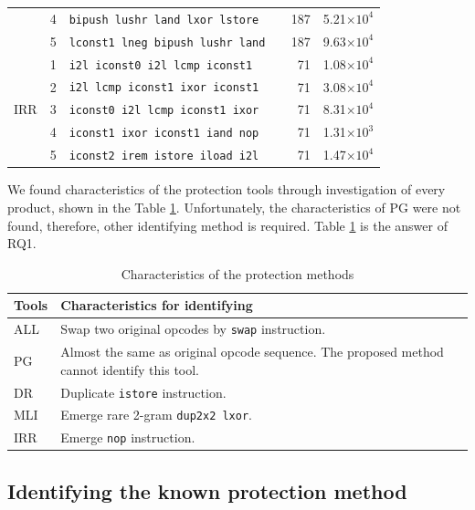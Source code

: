 \documentclass[conference]{IEEEtran}
\begin{document}
\begin{table}[t]
{\begin{tabular}{lc|l|r|r}
& 4 & \verb!bipush lushr land lxor lstore   ! & 187 & 5.21$\times10^4$ \\
& 5 & \verb!lconst1 lneg bipush lushr land  ! & 187 & 9.63$\times10^4$ \\ \hline
\multirow{5}{*}{{IRR}}
& 1 & \verb!i2l iconst0 i2l lcmp iconst1  ! & 71 & 1.08$\times10^4$ \\
& 2 & \verb!i2l lcmp iconst1 ixor iconst1 ! & 71 & 3.08$\times10^4$ \\
& 3 & \verb!iconst0 i2l lcmp iconst1 ixor ! & 71 & 8.31$\times10^4$ \\
& 4 & \verb!iconst1 ixor iconst1 iand nop ! & 71 & 1.31$\times10^3$ \\
& 5 & \verb!iconst2 irem istore iload i2l ! & 71 & 1.47$\times10^4$ \\
  \end{tabular}}
\end{table}

We found characteristics of the protection tools through investigation
of every product, shown in the Table \ref{table:characteristics}.
Unfortunately, the characteristics of PG were not found, therefore, other
identifying method is required.  Table \ref{table:characteristics} is
the answer of RQ1.

\begin{table}[t]
  \centering
  \footnotesize{
    \caption{Characteristics of the protection methods}\label{table:characteristics}
  \begin{tabular}{l|p{6.5cm}}
    \textbf{Tools} & \textbf{Characteristics for identifying} \\ \hline
    ALL  & Swap two original opcodes by \texttt{swap} instruction. \\
    PG   & Almost the same as original opcode sequence.  The proposed method cannot identify this tool. \\
    DR   & Duplicate \texttt{istore} instruction. \\
    MLI  & Emerge rare 2-gram \texttt{dup2x2 lxor}. \\
    IRR  & Emerge \texttt{nop} instruction. \\
  \end{tabular}}
\end{table}

\subsection{Identifying the known protection method}\label{sect:rq2-1}
\end{document}
